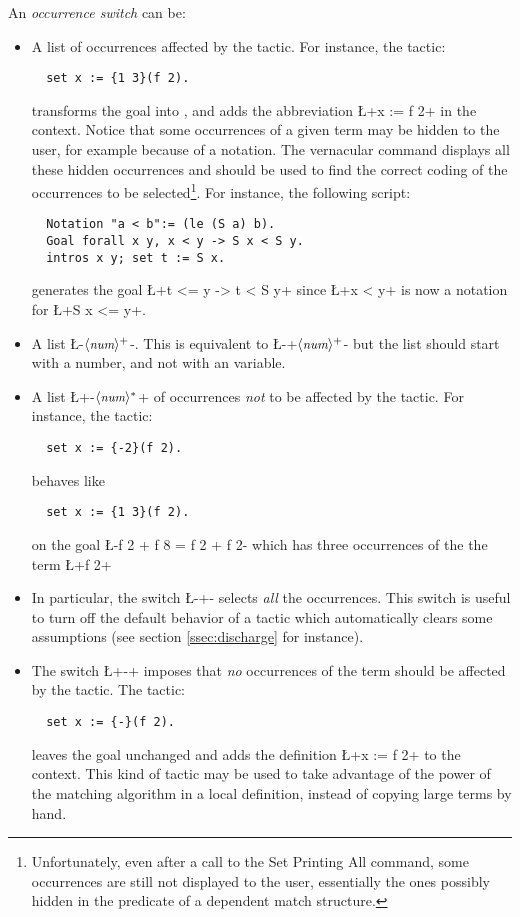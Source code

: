 An \emph{occurrence switch} can be:
\begin{itemize}
\item A list  of occurrences affected by the
  tactic.
For instance, the tactic:
\begin{lstlisting}
  set x := {1 3}(f 2).
\end{lstlisting}
transforms the goal  into
, and adds the abbreviation
\L+x := f 2+ in the
context. Notice that some occurrences of a
given term may be hidden to the user, for example because of a
notation. The vernacular  command displays all
these hidden occurrences and should be used to find the correct
coding of the occurrences to be selected\footnote{Unfortunately,
even after a call to the Set Printing All command, some occurrences are
still not displayed to the user, essentially the ones possibly hidden
in the predicate of a dependent match structure.}. For instance, the
following script:
\begin{lstlisting}
  Notation "a < b":= (le (S a) b).
  Goal forall x y, x < y -> S x < S y.
  intros x y; set t := S x.
\end{lstlisting}
generates the goal
\L+t <= y -> t < S y+ since \L+x < y+ is now a notation for
\L+S x <= y+.
\item A list \L-{$\langle\mbox{\itshape\rmfamily\small num}\rangle^+$}-. This is equivalent to
    \L-{+$\langle\mbox{\itshape\rmfamily\small num}\rangle^+$}- but the list should start with a number, and
  not with an \Ltac{} variable.
\item A list \L+{-$\langle\mbox{\itshape\rmfamily\small num}\rangle^*$}+ of occurrences \emph{not} to be
  affected by the tactic. For instance, the tactic:
\begin{lstlisting}
  set x := {-2}(f 2).
\end{lstlisting}
behaves like
\begin{lstlisting}
  set x := {1 3}(f 2).
\end{lstlisting}
on the goal \L-f 2 + f 8 = f 2 + f 2- which has three occurrences of
the the term \L+f 2+
\item In particular, the switch \L-{+}- selects \emph{all} the
  occurrences. This switch is useful to turn
  off the default behavior of a tactic which automatically clears
  some assumptions (see section \ref{ssec:discharge} for instance).
\item The switch \L+{-}+ imposes that \emph{no} occurrences of the
  term should be affected by the tactic. The tactic:
\begin{lstlisting}
  set x := {-}(f 2).
\end{lstlisting}
leaves the goal unchanged and adds the definition \L+x := f 2+ to the
context. This kind of tactic may be used to take advantage of the
power of the matching algorithm in a local definition, instead of
copying large terms by hand.
\end{itemize}


